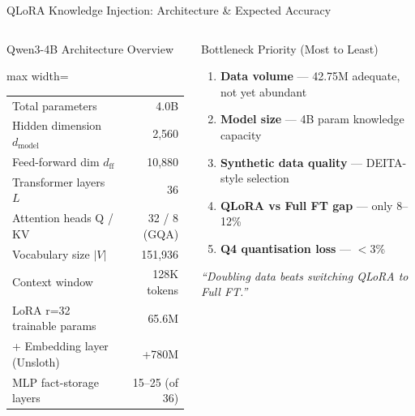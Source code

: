 \documentclass[aspectratio=169,11pt]{beamer}
\begin{document}
\begin{frame}[shrink=18]{QLoRA Knowledge Injection: Architecture \& Expected Accuracy}
\begin{columns}[T]

\begin{block}{Qwen3-4B Architecture Overview}
  \scriptsize
  \begin{adjustbox}{max width=\linewidth}
  \begin{tabular}{@{}lr@{}}
    \toprule
    Total parameters & 4.0B\\
    Hidden dimension $d_\text{model}$ & 2,560\\
    Feed-forward dim $d_\text{ff}$ & 10,880\\
    Transformer layers $L$ & 36\\
    Attention heads Q / KV & 32 / 8 (GQA)\\
    Vocabulary size $|V|$ & 151,936\\
    Context window & 128K tokens\\
    \midrule
    LoRA r=32 trainable params & 65.6M\\
    + Embedding layer (Unsloth) & +780M\\
    \midrule
    MLP fact-storage layers & 15--25 (of 36)\\
    \bottomrule
  \end{tabular}
  \end{adjustbox}
\end{block}

\begin{block}{Bottleneck Priority (Most to Least)}
  \scriptsize
  \begin{enumerate}\setlength\itemsep{1pt}
    \item \textbf{Data volume} --- 42.75M adequate, not yet abundant
    \item \textbf{Model size} --- 4B param knowledge capacity
    \item \textbf{Synthetic data quality} --- DEITA-style selection
    \item \textbf{QLoRA vs Full FT gap} --- only 8--12\%
    \item \textbf{Q4 quantisation loss} --- $<$3\%
  \end{enumerate}
  \textit{``Doubling data beats switching QLoRA to Full FT.''}
\end{block}



\end{columns}
\end{frame}
\end{document}
